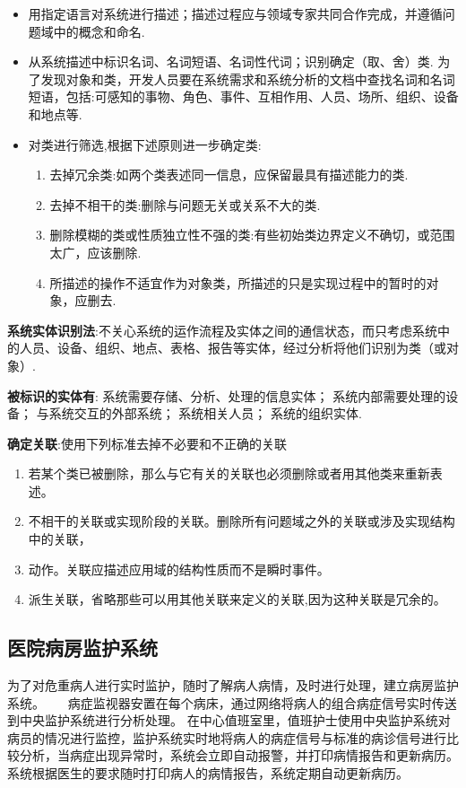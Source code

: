 \documentclass[../main.tex]{subfiles}
\begin{document}
\begin{itemize}
  \item 用指定语言对系统进行描述；描述过程应与领域专家共同合作完成，并遵循问题域中的概念和命名.
  \item 从系统描述中标识名词、名词短语、名词性代词；识别确定（取、舍）类.
    为了发现对象和类，开发人员要在系统需求和系统分析的文档中查找名词和名词短语，包括:可感知的事物、角色、事件、互相作用、人员、场所、组织、设备和地点等.
  \item 对类进行筛选,根据下述原则进一步确定类:
    \begin{enumerate}
      \item 去掉冗余类:如两个类表述同一信息，应保留最具有描述能力的类.
      \item 去掉不相干的类:删除与问题无关或关系不大的类.
      \item 删除模糊的类或性质独立性不强的类:有些初始类边界定义不确切，或范围太广，应该删除.
      \item 所描述的操作不适宜作为对象类，所描述的只是实现过程中的暂时的对象，应删去.
    \end{enumerate}
\end{itemize}
\noindent \textbf{系统实体识别法}:不关心系统的运作流程及实体之间的通信状态，而只考虑系统中的人员、设备、组织、地点、表格、报告等实体，经过分析将他们识别为类（或对象）.

\noindent \textbf{被标识的实体有}:
系统需要存储、分析、处理的信息实体；
系统内部需要处理的设备；
与系统交互的外部系统；
系统相关人员；
系统的组织实体.

\noindent \textbf{确定关联}:使用下列标准去掉不必要和不正确的关联
\begin{enumerate}
  \item 若某个类已被删除，那么与它有关的关联也必须删除或者用其他类来重新表述。
  \item 不相干的关联或实现阶段的关联。删除所有问题域之外的关联或涉及实现结构中的关联，
  \item 动作。关联应描述应用域的结构性质而不是瞬时事件。
  \item 派生关联，省略那些可以用其他关联来定义的关联,因为这种关联是冗余的。
\end{enumerate}
\subsection{医院病房监护系统}
\noindent 为了对危重病人进行实时监护，随时了解病人病情，及时进行处理，建立病房监护系统。　　
病症监视器安置在每个病床，通过网络将病人的组合病症信号实时传送到中央监护系统进行分析处理。
在中心值班室里，值班护士使用中央监护系统对病员的情况进行监控，监护系统实时地将病人的病症信号与标准的病诊信号进行比较分析，当病症出现异常时，系统会立即自动报警，并打印病情报告和更新病历。
系统根据医生的要求随时打印病人的病情报告，系统定期自动更新病历。
\end{document}

